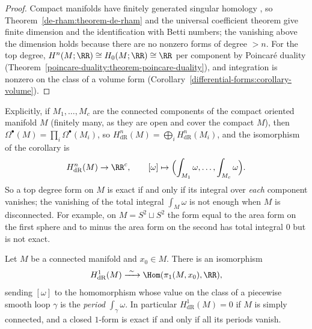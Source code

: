 \begin{proof}
Compact manifolds have finitely generated singular homology \cite[Appendix]{hatcher-at}, so Theorem~\ref{de-rham:theorem-de-rham} and the universal coefficient theorem give finite dimension and the
identification with Betti numbers; the vanishing above the dimension holds because there are no nonzero forms of degree $> n$. For the top degree, $H^n(M; \RR) \cong H_0(M; \RR) \cong \RR$ per component by
Poincar\'e duality (Theorem~\ref{poincare-duality:theorem-poincare-duality}), and integration is nonzero on the class of a volume form
(Corollary~\ref{differential-forms:corollary-volume}).
\end{proof}

Explicitly, if $M_1, \ldots, M_c$ are the connected components of the compact oriented manifold $M$ (finitely many, as they are open and cover the compact $M$), then
$\Omega^\bullet(M) = \prod_i\Omega^\bullet(M_i)$, so $H^n_{\mathrm{dR}}(M) = \bigoplus_iH^n_{\mathrm{dR}}(M_i)$, and the isomorphism of the corollary is
\[
H^n_{\mathrm{dR}}(M) \to \RR^c, \qquad [\omega] \mapsto \Bigl(\int_{M_1}\omega, \ldots, \int_{M_c}\omega\Bigr).
\]
So a top degree form on $M$ is exact if and only if its integral over \emph{each} component vanishes; the vanishing of the total integral $\int_M\omega$ is not enough when
$M$ is disconnected. For example, on $M = S^2 \sqcup S^2$ the form equal to the area form on the first sphere and to minus the area form on the second has total integral $0$ but is
not exact.

\begin{proposition}\label{de-rham:proposition-periods}
Let $M$ be a connected manifold and $x_0 \in M$. There is an isomorphism
\[
H^1_{\mathrm{dR}}(M) \xrightarrow{\ \sim\ } \Hom(\pi_1(M, x_0), \RR),
\]
sending $[\omega]$ to the homomorphism whose value on the class of a piecewise smooth loop $\gamma$ is the \emph{period} $\int_\gamma\omega$. In particular $H^1_{\mathrm{dR}}(M) = 0$ if $M$ is simply connected, and a closed
$1$-form is exact if and only if all its periods vanish.
\end{proposition}

